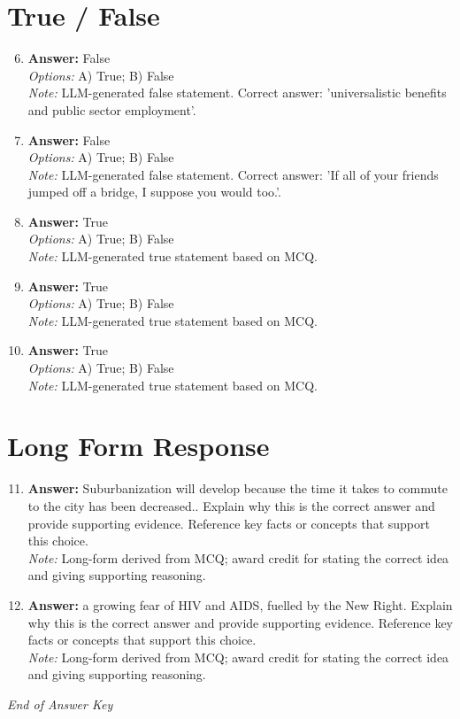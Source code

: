 \documentclass[12pt]{article}
\begin{document}
\section*{True / False}
\begin{enumerate}[label=\arabic*.]
\setcounter{enumi}{5}
\item \textbf{Answer:} False
\\ \textit{Options:} A) True; B) False
\\ \textit{Note:} LLM-generated false statement. Correct answer: 'universalistic benefits and public sector employment'.
\item \textbf{Answer:} False
\\ \textit{Options:} A) True; B) False
\\ \textit{Note:} LLM-generated false statement. Correct answer: 'If all of your friends jumped off a bridge, I suppose you would too.'.
\item \textbf{Answer:} True
\\ \textit{Options:} A) True; B) False
\\ \textit{Note:} LLM-generated true statement based on MCQ.
\item \textbf{Answer:} True
\\ \textit{Options:} A) True; B) False
\\ \textit{Note:} LLM-generated true statement based on MCQ.
\item \textbf{Answer:} True
\\ \textit{Options:} A) True; B) False
\\ \textit{Note:} LLM-generated true statement based on MCQ.
\end{enumerate}

\section*{Long Form Response}
\begin{enumerate}[label=\arabic*.]
\setcounter{enumi}{10}
\item \textbf{Answer:} Suburbanization will develop because the time it takes to commute to the city has been decreased.. Explain why this is the correct answer and provide supporting evidence. Reference key facts or concepts that support this choice.
\\ \textit{Note:} Long-form derived from MCQ; award credit for stating the correct idea and giving supporting reasoning.
\item \textbf{Answer:} a growing fear of HIV and AIDS, fuelled by the New Right. Explain why this is the correct answer and provide supporting evidence. Reference key facts or concepts that support this choice.
\\ \textit{Note:} Long-form derived from MCQ; award credit for stating the correct idea and giving supporting reasoning.
\end{enumerate}

\vfill
\noindent\textit{End of Answer Key}
\end{document}
